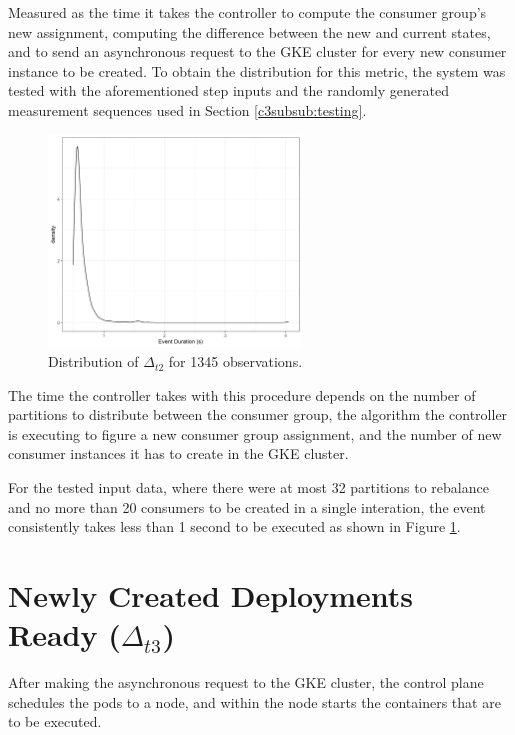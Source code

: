 Measured as the time it takes the controller to compute the consumer group's new
assignment, computing the difference between the new and current states, and to
send an asynchronous request to the GKE cluster for every new consumer instance
to be created. To obtain the distribution for this metric, the system was tested
with the aforementioned step inputs and the randomly generated measurement
sequences used in Section \ref{c3subsub:testing}.

\begin{figure}[htb!]
\centering
\includegraphics[width=0.6\textwidth]{images/integration/delta2.png}
\caption{
    Distribution of $\Delta_{t2}$ for 1345 observations.
}
\label{fig:controller_result_trigger}
\end{figure}

The time the controller takes with this procedure depends on the number of
partitions to distribute between the consumer group, the algorithm the
controller is executing to figure a new consumer group assignment, and the
number of new consumer instances it has to create in the GKE cluster.

For the tested input data, where there were at most 32 partitions to rebalance
and no more than 20 consumers to be created in a single interation, the event
consistently takes less than 1 second to be executed as shown in Figure
\ref{fig:controller_result_trigger}.

\section{Newly Created Deployments Ready ($\Delta_{t3}$)}

After making the asynchronous request to the GKE cluster, the control plane
schedules the pods to a node, and within the node starts the containers that are
to be executed.

